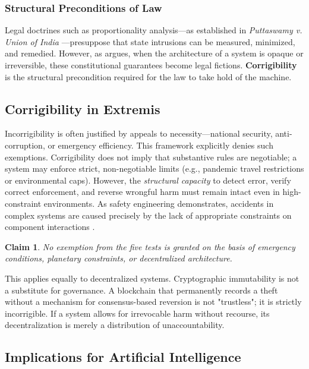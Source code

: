 \documentclass{article}
\newtheorem{claim}{Claim}
\begin{document}
\subsubsection{Structural Preconditions of Law}
Legal doctrines such as proportionality analysis---as established in \textit{Puttaswamy v. Union of India} \citep{puttaswamy2017}---presuppose that state intrusions can be measured, minimized, and remedied. However, as \citet{bhatia2019} argues, when the architecture of a system is opaque or irreversible, these constitutional guarantees become legal fictions. \textbf{Corrigibility} is the structural precondition required for the law to take hold of the machine.

\subsection{Corrigibility in Extremis}

Incorrigibility is often justified by appeals to necessity---national security, anti-corruption, or emergency efficiency. This framework explicitly denies such exemptions. Corrigibility does not imply that substantive rules are negotiable; a system may enforce strict, non-negotiable limits (e.g., pandemic travel restrictions or environmental caps). However, the \textit{structural capacity} to detect error, verify correct enforcement, and reverse wrongful harm must remain intact even in high-constraint environments. As safety engineering demonstrates, accidents in complex systems are caused precisely by the lack of appropriate constraints on component interactions \citep{leveson2011}.

\begin{claim}
No exemption from the five tests is granted on the basis of emergency conditions, planetary constraints, or decentralized architecture.
\end{claim}

This applies equally to decentralized systems. Cryptographic immutability is not a substitute for governance. A blockchain that permanently records a theft without a mechanism for consensus-based reversion is not "trustless"; it is strictly incorrigible. If a system allows for irrevocable harm without recourse, its decentralization is merely a distribution of unaccountability.

\subsection{Implications for Artificial Intelligence}
\end{document}

